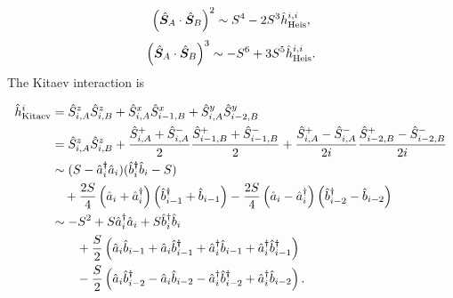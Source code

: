 \documentclass[11pt, aps, longbibliography]{article}
\begin{document}
\begin{align}
    \left( \hat{\bm{S}}_A \cdot \hat{\bm{S}}_B \right)^2 \sim S^4 -2S^3 \hat{h}_{\rm Heis}^{i,i},
\end{align}
\begin{align}
    \left( \hat{\bm{S}}_A \cdot \hat{\bm{S}}_B \right)^3 \sim -S^6 + 3S^5 \hat{h}_{\rm Heis}^{i,i}.
\end{align}
The Kitaev interaction is 

\begin{align}
    \hat{h}_{\rm Kitaev}^i &= \hat{S}^z_{i,A}\hat{S}^z_{i,B} + \hat{S}^x_{i,A}\hat{S}^x_{i-1,B} + \hat{S}^y_{i,A}\hat{S}^y_{i-2,B}  \notag \\
    &=  \hat{S}^z_{i,A}\hat{S}^z_{i,B} + \frac{\hat{S}^+_{i,A} + \hat{S}^-_{i,A}}{2}\frac{\hat{S}^+_{i-1,B} + \hat{S}^-_{i-1,B}}{2} + \frac{\hat{S}^+_{i,A} - \hat{S}^-_{i,A}}{2i}\frac{\hat{S}^+_{i-2, B} - \hat{S}^-_{i-2, B}}{2i} \notag \\
    &\sim (S-\hat{a}^\dagger_i \hat{a}_i)(\hat{b}^\dagger_i \hat{b}_i -S )\notag   \\ 
    & \quad  +\frac{2S}{4} \left(  \hat{a}_i + \hat{a}^{\dagger}_i \right) \left( \hat{b}^{\dagger}_{i-1} + \hat{b}_{i-1} \right)   -\frac{2S}{4} \left(  \hat{a}_i - \hat{a}^{\dagger}_i \right) \left( \hat{b}^{\dagger}_{i-2} - \hat{b}_{i-2} \right) \notag \\
    &\sim  -S^2 +S \hat{a}^\dagger_i \hat{a}_i  + S\hat{b}^\dagger_i \hat{b}_i  \notag \\ 
    & \quad \quad  + \frac{S}{2} \left( \hat{a}_i\hat{b}_{i-1} + \hat{a}_i\hat{b}_{i-1}^\dagger + \hat{a}_i^\dagger \hat{b}_{i-1} + \hat{a}_i^\dagger\hat{b}_{i-1}^\dagger \right) \notag \\ 
    & \quad \quad  - \frac{S}{2} \left( \hat{a}_i\hat{b}_{i-2}^\dagger - \hat{a}_i\hat{b}_{i-2} - \hat{a}_i^\dagger \hat{b}_{i-2}^\dagger + \hat{a}_i^\dagger\hat{b}_{i-2} \right). 
\end{align} 
\end{document}
